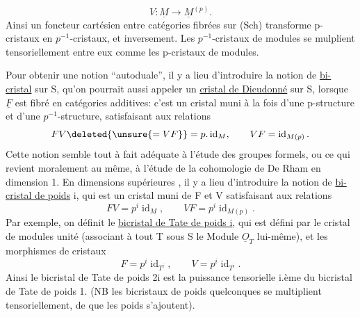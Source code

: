 \[
V:\underline M\longrightarrow\underline M^{(p)}.
\]
Ainsi un foncteur cartésien entre catégories fibrées sur (Sch) transforme p-cristaux en $p^{-1}$-cristaux, et inversement. Les $p^{-1}$-cristaux de modules se mulplient tensoriellement entre eux comme les p-cristaux de modules.

Pour obtenir une notion ``autoduale'', il y a lieu d'introduire la notion de \uline{bi-cristal}  sur S, qu'on pourrait aussi appeler un \uline{cristal de Dieudonné} sur S, lorsque $\underline F$ est fibré en catégories additives: c'est un cristal muni à la fois d'une p-structure et d'une $p^{-1}$-structure, satisfaisant aux relations
\[
FV\deleted{\unsure{=VF}}=p.\operatorname{id}_M,\qquad VF=\operatorname{id}_{M(p)}.
\]
Cette notion semble tout à fait adéquate à l'étude des groupes formels, ou ce qui revient moralement au même, à l'étude de la cohomologie de De Rham en dimension 1. En dimensions supérieures , il y a lieu d'introduire la notion de \uline{bi-cristal de poids} i, qui est un cristal muni de F et V satisfaisant aux relations
\[
FV=p^i\operatorname{id}_M,\qquad VF=p^i\operatorname{id}_{M(p)}.
\]
Par exemple, on définit le \uline{bicristal de Tate de poids i}, qui est défini par le cristal de modules unité (associant à tout T sous S le Module $\underline O_T$ lui-même), et les  morphismes de cristaux
\[
F=p^i\operatorname{id}_{T^i},\qquad V=p^i\operatorname{id}_{T^i}.
\]
Ainsi le bicristal de Tate de poids 2i est la puissance tensorielle i.ème du bicristal de Tate de poids 1. (NB les bicristaux de poids quelconques se multiplient tensoriellement, de   que les poids s'ajoutent).

